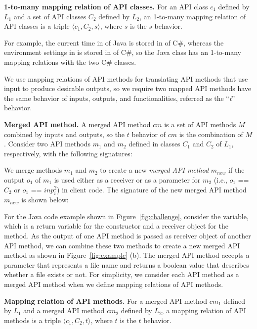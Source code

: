 \textbf{1-to-many mapping relation of API classes.} For an API class
$c_1$ defined by $L_1$ and a set of API classes $C_2$ defined by
$L_2$, an 1-to-many mapping relation of API classes is a triple
$\langle c_1, C_2, s \rangle$, where $s$ is the $s$ behavior.

For example, the current time in  of Java
is stored in  of C\#, whereas the
environment settings in  is stored in
 of C\#, so the Java class has an
1-to-many mapping relations with the two C\# classes.

We use mapping relations of API methods for translating API methods
that use input to produce desirable outputs, so we require two
mapped API methods have the same behavior of inputs, outputs, and
functionalities, referred as the ``\emph{t}'' behavior.

\textbf{Merged API method.} A merged API method $cm$ is a set of API
methods $M$ combined by inputs and outputs, so the $t$ behavior of
$cm$ is the combination of $M$. Consider two API methods $m_1$ and
$m_2$ defined in classes $C_1$ and $C_2$ of $L_1$, respectively,
with the following signatures:



We merge methods $m_1$ and $m_2$ to create a new \emph{merged API
method} $m_{new}$ if the output $o_1$ of $m_1$ is used either as a
receiver or as a parameter for $m_2$ (i.e., $o_1$ == $C_2$ or $o_1$
== $inp_i^2$) in client code. The signature of the new merged API
method $m_{new}$ is shown below:


For the Java code example shown in Figure~\ref{fig:challenge},
consider the  variable, which is a return variable for
the constructor and a receiver object for the 
method. As the output of one API method is passed as receiver object
of another API method, we can combine these two methods to create a
new merged API method  as shown
in Figure~\ref{fig:example} (b). The merged API method accepts a
 parameter that represents a file name and returns a
boolean value that describes whether a file exists or not. For
simplicity, we consider each API method as a merged API method when
we define mapping relations of API methods.

\textbf{Mapping relation of API methods.} For a merged API method
$cm_1$ defined by $L_1$ and a merged API method $cm_2$ defined by
$L_2$, a mapping relation of API methods is a triple $\langle c_1,
C_2, t \rangle$, where $t$ is the $t$ behavior.
